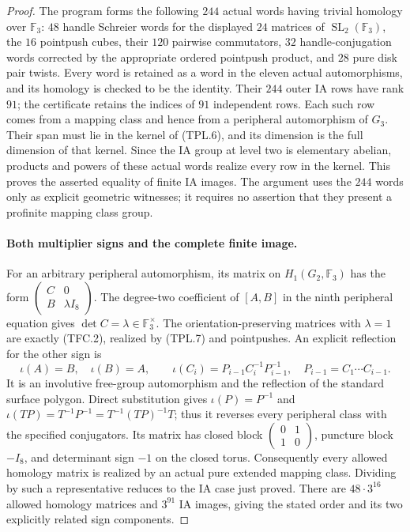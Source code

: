 \begin{proof}
The program forms the following $244$ actual words having
trivial homology over $\mathbb F_3$: $48$ handle Schreier
words for the displayed $24$ matrices of
$\operatorname{SL}_2(\mathbb F_3)$, the $16$ pointpush cubes,
their $120$ pairwise commutators, $32$ handle-conjugation words
corrected by the appropriate ordered pointpush product, and
$28$ pure disk pair twists.
Every word is retained as a word in the eleven actual
automorphisms, and its homology is checked to be the identity.
Their $244$ outer IA rows have rank $91$; the certificate
retains the indices of $91$ independent rows.
Each such row comes from a mapping class and hence from a
peripheral automorphism of $G_3$.
Their span must lie in the kernel of (TPL.6), and its dimension
is the full dimension of that kernel.  Since the IA group at
level two is elementary abelian, products and powers of these
actual words realize every row in the kernel.
This proves the asserted equality of finite IA images.
The argument uses the $244$ words only as explicit geometric
witnesses; it requires no assertion that they present a
profinite mapping class group.

\paragraph{Both multiplier signs and the complete finite image.}
For an arbitrary peripheral automorphism, its matrix on
$H_1(G_2,\mathbb F_3)$ has the form
$\left(\begin{smallmatrix}C&0\\B&\lambda I_8\end{smallmatrix}\right)$.
The degree-two coefficient of $[A,B]$ in the ninth peripheral
equation gives $\det C=\lambda\in\mathbb F_3^\times$.
The orientation-preserving matrices with $\lambda=1$ are
exactly (TFC.2), realized by (TPL.7) and pointpushes.
An explicit reflection for the other sign is
\[
 \iota(A)=B,\quad \iota(B)=A,\qquad
 \iota(C_i)=P_{i-1}C_i^{-1}P_{i-1}^{-1},
 \quad P_{i-1}=C_1\cdots C_{i-1}.                     \tag{TPL.8}
\]
It is an involutive free-group automorphism and the reflection
of the standard surface polygon.  Direct substitution gives
$\iota(P)=P^{-1}$ and
$\iota(TP)=T^{-1}P^{-1}=T^{-1}(TP)^{-1}T$;
thus it reverses every peripheral class with the specified
conjugators.  Its matrix has closed block
$\left(\begin{smallmatrix}0&1\\1&0\end{smallmatrix}\right)$,
puncture block $-I_8$, and determinant sign $-1$ on the
closed torus.
Consequently every allowed homology matrix is realized by an
actual pure extended mapping class.  Dividing by such a
representative reduces to the IA case just proved.
There are $48\cdot3^{16}$ allowed homology matrices and
$3^{91}$ IA images, giving the stated order and its two
explicitly related sign components.
\end{proof}

